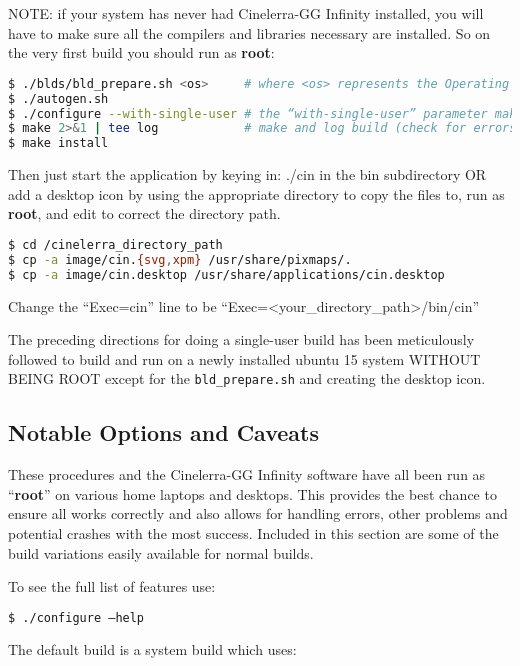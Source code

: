 NOTE: if your system has never had Cinelerra-GG Infinity installed, you will have to make sure all
the compilers and libraries necessary are installed. So on the very first build you should run as \textbf{root}:

\begin{lstlisting}[language=bash]
$ ./blds/bld_prepare.sh <os>     # where <os> represents the Operating System of centos, fedora, suse, leap, ubuntu, debian.
$ ./autogen.sh
$ ./configure --with-single-user # the “with-single-user” parameter makes it so
$ make 2>&1 | tee log            # make and log build (check for errors before proceeding)
$ make install
\end{lstlisting}

Then just start the application by keying in: ./cin in the bin subdirectory OR add a desktop icon by
using the appropriate directory to copy the files to, run as \textbf{root}, and edit to correct the directory path.

\begin{lstlisting}[language=bash]
$ cd /cinelerra_directory_path
$ cp -a image/cin.{svg,xpm} /usr/share/pixmaps/.
$ cp -a image/cin.desktop /usr/share/applications/cin.desktop
\end{lstlisting}
Change the “Exec=cin” line to be “Exec=<your\_directory\_path>/bin/cin”

The preceding directions for doing a single-user build has been meticulously followed to build and run
on a newly installed ubuntu 15 system WITHOUT BEING ROOT except for the \texttt{bld\_prepare.sh} and creating the desktop icon.

\subsection{Notable Options and Caveats}%
\label{sub:notable_options_and_caveats}

These procedures and the Cinelerra-GG Infinity software have all been run as “\textbf{root}” on various home laptops and desktops. This provides the best chance to ensure all works correctly and also allows for handling errors, other problems and potential crashes with the most success.  Included in this section are some of the build variations easily available for normal builds.

To see the full list of features use:	 

\begin{lstlisting}[language=bash]
$ ./configure –help
\end{lstlisting}
The default build is a system build which uses:    

